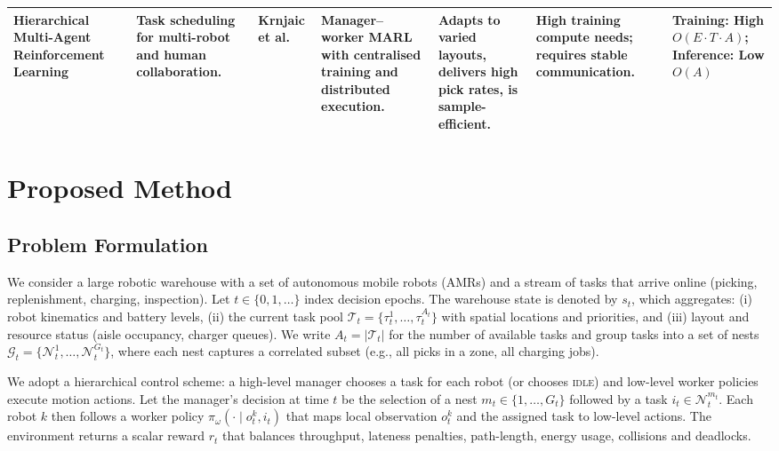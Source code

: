 \documentclass[journal,onecolumn]{IEEEtran}
\begin{document}
\begin{table}[!t]
{\begin{tabular}{p{2.7cm}p{4.9cm}p{3.2cm}p{4.8cm}p{3.8cm}p{4.2cm}p{2.8cm}}
      Hierarchical Multi-Agent Reinforcement Learning &
      Task scheduling for multi-robot and human collaboration. &
      Krnjaic et al.\ \citep{krnjaic2023hierarchical} &
      Manager–worker MARL with centralised training and distributed execution. &
      Adapts to varied layouts, delivers high pick rates, is sample-efficient. &
      High training compute needs; requires stable communication. &
      Training: High $O(E\!\cdot\!T\!\cdot\!A)$; Inference: Low $O(A)$ \\[2pt]
    \bottomrule
  \end{tabular}}
\end{table}


\section{Proposed Method}

\subsection{Problem Formulation}
We consider a large robotic warehouse with a set of autonomous mobile robots (AMRs) and a stream of tasks that arrive online (picking, replenishment, charging, inspection). Let \(t\in\{0,1,\dots\}\) index decision epochs. The warehouse state is denoted by \(s_t\), which aggregates: (i) robot kinematics and battery levels, (ii) the current task pool \(\mathcal{T}_t=\{\tau^1_t,\dots,\tau^{A_t}_t\}\) with spatial locations and priorities, and (iii) layout and resource status (aisle occupancy, charger queues). We write \(A_t=|\mathcal{T}_t|\) for the number of available tasks and group tasks into a set of nests \(\mathcal{G}_t=\{\mathcal{N}^1_t,\dots,\mathcal{N}^{G_t}_t\}\), where each nest captures a correlated subset (e.g., all picks in a zone, all charging jobs).

We adopt a hierarchical control scheme: a high-level manager chooses a task for each robot (or chooses \textsc{idle}) and low-level worker policies execute motion actions. Let the manager’s decision at time \(t\) be the selection of a nest \(m_t\in\{1,\dots,G_t\}\) followed by a task \(i_t\in\mathcal{N}^{m_t}_t\). Each robot \(k\) then follows a worker policy \(\pi_\omega(\cdot\mid o^k_t, i_t)\) that maps local observation \(o^k_t\) and the assigned task to low-level actions. The environment returns a scalar reward \(r_t\) that balances throughput, lateness penalties, path-length, energy usage, collisions and deadlocks.
\end{document}

